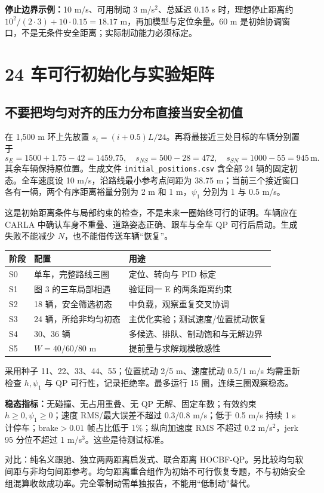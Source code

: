 \documentclass[UTF8,fontset=fandol,11pt,a4paper]{ctexart}
\newcommand{\unit}[1]{\,\mathrm{#1}}\newcommand{\nom}{\mathrm{nom}}
\newcommand{\page}[1]{\clearpage\section{#1}}
\begin{document}
\textbf{停止边界示例：}10 m/s、可用制动 3 m/s$^2$、总延迟 0.15 s 时，理想停止距离约 $10^2/(2\cdot3)+10\cdot0.15=18.17$ m，再加模型与定位余量。60 m 是初始协调窗口，不是无条件安全距离；实际制动能力必须标定。

\page{24 车可行初始化与实验矩阵}
\label{sec:init}
\subsection{不要把均匀对齐的压力分布直接当安全初值}
在 1,500 m 环上先放置 $s_i=(i+0.5)L/24$。再将最接近三处目标的车辆分别置于
\[
s_E=1500+1.75-42=1459.75,\quad s_{NS}=500-28=472,\quad s_{SN}=1000-55=945\unit{m}.
\]
其余车辆保持原位置。生成文件 \texttt{initial\_positions.csv} 含全部 24 辆的固定初态。全车速度设 10 m/s，沿路线最小参考点间距为 38.75 m；当前三个接近窗口各有一辆，两个有序距离裕量分别为 2 m 和 1 m，$\psi_1$ 分别为 1 与 0.5 m/s。

这是初始距离条件与局部约束的检查，不是未来一圈始终可行的证明。车辆应在 CARLA 中确认车身不重叠、道路姿态正确、跟车与全车 QP 可行后启动。生成失败不能减少 $N$，也不能借传送车辆“恢复”。
\begin{center}\small
\begin{tabular}{P{2.3cm}P{5.6cm}P{5.6cm}}\toprule
阶段 & 配置 & 用途\\\midrule
S0 & 单车，完整路线三圈 & 定位、转向与 PID 标定\\
S1 & 图 3 的三车局部相遇 & 验证同一 E 的两条距离约束\\
S2 & 18 辆，安全筛选初态 & 中负载，观察重复交叉协调\\
S3 & 24 辆，所给非均匀初态 & 主优化实验；测试速度/位置扰动恢复\\
S4 & 30、36 辆 & 多候选、排队、制动饱和与无解边界\\
S5 & $W=40/60/80$ m & 提前量与求解规模敏感性\\\bottomrule
\end{tabular}\end{center}
采用种子 11、22、33、44、55；位置扰动 2/5 m、速度扰动 0.5/1 m/s 均需重新检查 $h,\psi_1$ 与 QP 可行性，记录拒绝率。最多运行 15 圈，连续三圈观察稳态。

\textbf{稳态指标：}无碰撞、无占用重叠、无 QP 无解、固定车数；有效约束 $h\geq0,\psi_1\geq0$；速度 RMS/最大误差不超过 0.3/0.8 m/s；低于 0.5 m/s 持续 1 s 计停车；brake$>0.01$ 帧占比低于 1\%；纵向加速度 RMS 不超过 0.2 m/s$^2$，jerk 95 分位不超过 1 m/s$^3$。这些是待测试标准。

对比：纯名义跟驰、独立两两距离启发式、联合距离 HOCBF-QP。另比较均匀软间距与非均匀间距参考。均匀距离重合组作为初始不可行恢复专题，不与初始安全组混算收敛成功率。完全零制动需单独报告，不能用“低制动”替代。
\end{document}
